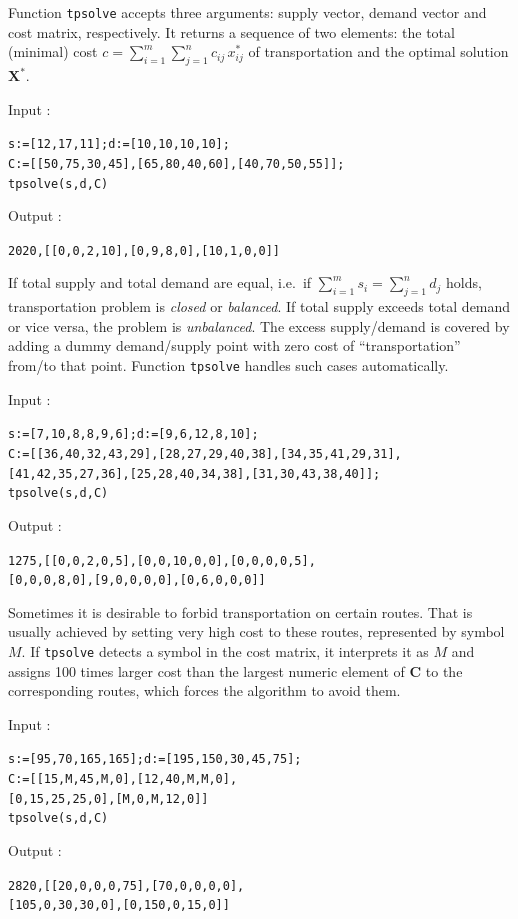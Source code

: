 \documentclass[a4paper,11pt]{book}
\begin{document}
Function {\tt tpsolve} accepts three arguments: supply vector, demand vector and cost matrix, respectively. It returns a sequence of two elements: the total (minimal) cost $ c=\sum_{i=1}^m\sum_{j=1}^nc_{ij}\,x^*_{ij} $ of transportation and the optimal solution $ \mathbf{X}^* $.

\noindent Input :
\begin{center}
{\tt s:=[12,17,11];d:=[10,10,10,10];}\\
{\tt C:=[[50,75,30,45],[65,80,40,60],[40,70,50,55]];}\\
{\tt tpsolve(s,d,C)}
\end{center}
Output :
\begin{center}
{\tt 2020,[[0,0,2,10],[0,9,8,0],[10,1,0,0]]}
\end{center}

If total supply and total demand are equal, i.e.~if $ \sum_{i=1}^ms_i=\sum_{j=1}^nd_j $ holds, transportation problem is \emph{closed} or \emph{balanced}. If total supply exceeds total demand or vice versa, the problem is \emph{unbalanced}. The excess supply/demand is covered by adding a dummy demand/supply point with zero cost of ``transportation'' from/to that point. Function {\tt tpsolve} handles such cases automatically.

\noindent Input :
\begin{center}
{\tt s:=[7,10,8,8,9,6];d:=[9,6,12,8,10];}\\
{\tt C:=[[36,40,32,43,29],[28,27,29,40,38],[34,35,41,29,31],}\\
{\tt [41,42,35,27,36],[25,28,40,34,38],[31,30,43,38,40]];}\\
{\tt tpsolve(s,d,C)}
\end{center}
Output :
\begin{center}
{\tt 1275,[[0,0,2,0,5],[0,0,10,0,0],[0,0,0,0,5],}\\
{\tt [0,0,0,8,0],[9,0,0,0,0],[0,6,0,0,0]]}
\end{center}

Sometimes it is desirable to forbid transportation on certain routes. That is usually achieved by setting very high cost to these routes, represented by symbol $ M $. If {\tt tpsolve} detects a symbol in the cost matrix, it interprets it as $ M $ and assigns 100 times larger cost than the largest numeric element of $ \mathbf{C} $ to the corresponding routes, which forces the algorithm to avoid them.

\noindent Input :
\begin{center}
{\tt s:=[95,70,165,165];d:=[195,150,30,45,75];}\\
{\tt C:=[[15,M,45,M,0],[12,40,M,M,0],}\\
{\tt [0,15,25,25,0],[M,0,M,12,0]]}\\
{\tt tpsolve(s,d,C)}
\end{center}
Output :
\begin{center}
{\tt 2820,[[20,0,0,0,75],[70,0,0,0,0],}\\
{\tt [105,0,30,30,0],[0,150,0,15,0]]}
\end{center}
\end{document}
